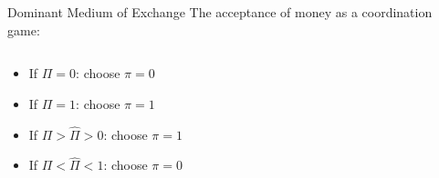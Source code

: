 \documentclass[]{beamer}
\begin{document}
\begin{frame}{Dominant Medium of Exchange}
	The acceptance of money as a coordination game:
	\begin{columns}[T]
		\begin{column}{0.5\textwidth}
			\begin{footnotesize}
				\begin{itemize}
					\item \alert<1>{If $\Pi = 0$: choose $\pi = 0$}
					\item<2-> \alert<2>{If $\Pi = 1$: choose $\pi = 1$}
					\item<3-> \alert<3>{If $\Pi > \hat\Pi > 0$: choose $\pi = 1$}
					\item<3-> \alert<3>{If $\Pi < \hat\Pi < 1$: choose $\pi = 0$}
				\end{itemize}
			\end{footnotesize}
			\begin{figure}
				
			\end{figure}
		\end{column}
		\begin{column}{0.5\textwidth}
			\begin{figure}
				
			\end{figure}
		\end{column}
	\end{columns}
\end{frame}
\end{document}
